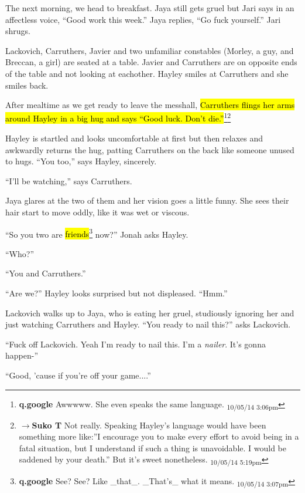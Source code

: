 
The next morning, we head to breakfast.  Jaya still gets gruel but Jari says in an affectless voice, ``Good work this week.''  Jaya replies, ``Go fuck yourself.''  Jari shrugs.



Lackovich, Carruthers, Javier and two unfamiliar constables (Morley, a guy, and Breccan, a girl) are seated at a table.  Javier and Carruthers are on opposite ends of the table and not looking at eachother.  Hayley smiles at Carruthers and she smiles back.  

After mealtime as we get ready to leave the messhall, \hl{Carruthers flings her arms around Hayley in a big hug and says ``Good luck.  Don't die.''}\footnote{\textbf{q.google }Awwwww.  She even speaks the same language. \textsubscript{10/05/14 3:06pm}}\footnote{$\rightarrow$\textbf{Suko T }Not really.  Speaking Hayley's language would have been something more like:''I encourage you to make every effort to avoid being in a fatal situation, but I understand if such a thing is unavoidable.  I would be saddened by your death.''  But it's sweet nonetheless. \textsubscript{10/05/14 5:19pm}}

Hayley is startled and looks uncomfortable at first but then relaxes and awkwardly returns the hug, patting Carruthers on the back like someone unused to hugs.  ``You too,'' says Hayley, sincerely.

``I'll be watching,'' says Carruthers.

Jaya glares at the two of them and her vision goes a little funny.  She sees their hair start to move oddly, like it was wet or viscous.

``So you two are \hl{friends}\footnote{\textbf{q.google }See?  See?  Like \_that\_.  \_That's\_ what it means. \textsubscript{10/05/14 3:07pm}} now?'' Jonah asks Hayley.

``Who?''

``You and Carruthers.''

``Are we?'' Hayley looks surprised but not displeased.  ``Hmm.''

Lackovich walks up to Jaya, who is eating her gruel, studiously ignoring her and just watching Carruthers and Hayley.  ``You ready to nail this?'' asks Lackovich.

``Fuck off Lackovich.  Yeah I'm ready to nail this.  I'm a \textit{nailer}.  It's gonna happen-''

``Good, 'cause if you're off your game....''


